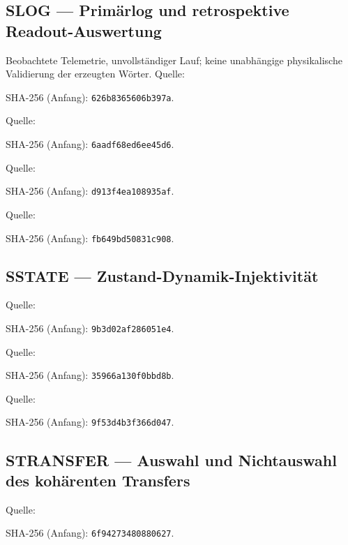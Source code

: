 \subsection*{SLOG — Primärlog und retrospektive Readout-Auswertung}\label{s:LOG}
Beobachtete Telemetrie, unvollständiger Lauf; keine unabhängige physikalische Validierung der erzeugten Wörter.
Quelle: \par{\footnotesize SHA-256 (Anfang): \texttt{626b8365606b397a}.}\par
Quelle: \par{\footnotesize SHA-256 (Anfang): \texttt{6aadf68ed6ee45d6}.}\par
Quelle: \par{\footnotesize SHA-256 (Anfang): \texttt{d913f4ea108935af}.}\par
Quelle: \par{\footnotesize SHA-256 (Anfang): \texttt{fb649bd50831c908}.}\par
\subsection*{SSTATE — Zustand-Dynamik-Injektivität}\label{s:STATE}
Quelle: \par{\footnotesize SHA-256 (Anfang): \texttt{9b3d02af286051e4}.}\par
Quelle: \par{\footnotesize SHA-256 (Anfang): \texttt{35966a130f0bbd8b}.}\par
Quelle: \par{\footnotesize SHA-256 (Anfang): \texttt{9f53d4b3f366d047}.}\par
\subsection*{STRANSFER — Auswahl und Nichtauswahl des kohärenten Transfers}\label{s:TRANSFER}
Quelle: \par{\footnotesize SHA-256 (Anfang): \texttt{6f94273480880627}.}\par
